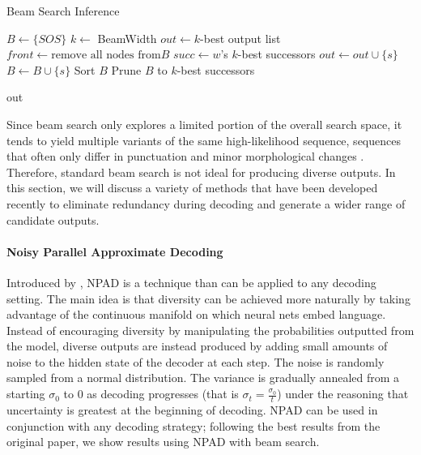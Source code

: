\begin{algorithm}
\caption{Beam Search Inference}
\label{alg:beam-search-inference}

\begin{algorithmic}[1]
\State $B \gets \{SOS\}$
\State $k \gets $ BeamWidth
\State $out \gets k$-best output list
    \State $front \gets \text{remove all nodes from} B$
    \State $succ \gets w$'s $k$-best successors
        \State $out \gets out \cup \{s\}$
    \Else
        \State $B \gets B \cup \{s\}$
    \EndIf
    \EndFor
    \EndFor
    \State Sort $B$
        \State Prune $B$ to $k$-best successors
    \EndIf
\EndWhile

\Return out
\EndProcedure
\end{algorithmic}
\end{algorithm}

Since beam search only explores a limited portion of the overall search space, it tends to yield multiple variants of the same high-likelihood sequence, sequences that often only differ in punctuation and minor morphological changes \cite{li2016mutual}.  
Therefore, standard beam search is not ideal for producing diverse outputs.
In this section, we will discuss a variety of methods that have been developed recently to eliminate redundancy during decoding and generate a wider range of candidate outputs.

\paragraph{Noisy Parallel Approximate Decoding}\quad
Introduced by \citet{cho2016noisy}, NPAD is a technique than can be applied to any decoding setting.
The main idea is that diversity can be achieved more naturally by taking advantage of the continuous manifold on which neural nets embed language.
Instead of encouraging diversity by manipulating the probabilities outputted from the model, diverse outputs are instead produced by adding small amounts of noise to the hidden state of the decoder at each step.
The noise is randomly sampled from a normal distribution. The variance is gradually annealed from a starting $\sigma_0$ to 0 as decoding progresses (that is $\sigma_t = \frac{\sigma_0}{t}$) under the reasoning that uncertainty is greatest at the beginning of decoding.
NPAD can be used in conjunction with any decoding strategy; following the best results from the original paper, we show results using NPAD with beam search.

